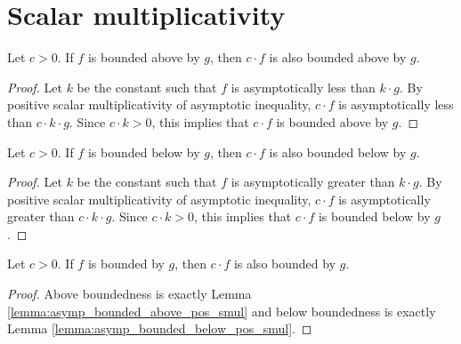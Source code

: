 \section{Scalar multiplicativity}

\begin{lemma}
    \label{lemma:asymp_bounded_above_pos_smul}
    \leanok
    Let $c > 0$. If $f$ is bounded above by $g$, then $c \cdot f$ is also bounded
    above by $g$.
\end{lemma}

\begin{proof}
    \leanok
    Let $k$ be the constant such that $f$ is asymptotically less than $k \cdot g$.
    By positive scalar multiplicativity of asymptotic inequality, $c \cdot f$ is 
    asymptotically less than $c \cdot k \cdot g$. Since $c \cdot k > 0$, this implies 
    that $c \cdot f$ is bounded above by $g$.
\end{proof}

\begin{lemma}
    \label{lemma:asymp_bounded_below_pos_smul}
    \leanok
    Let $c > 0$. If $f$ is bounded below by $g$, then $c \cdot f$ is also bounded
    below by $g$.
\end{lemma}

\begin{proof}
    \leanok
    Let $k$ be the constant such that $f$ is asymptotically greater than $k \cdot g$.
    By positive scalar multiplicativity of asymptotic inequality, $c \cdot f$ is 
    asymptotically greater than $c \cdot k \cdot g$. Since $c \cdot k > 0$, this implies
    that $c \cdot f$ is bounded below by $g$.
\end{proof}

\begin{lemma}
    \label{lemma:asymp_bounded_pos_smul}
    \leanok
    Let $c > 0$. If $f$ is bounded by $g$, then $c \cdot f$ is also bounded by $g$.
\end{lemma}

\begin{proof}
    \leanok
    Above boundedness is exactly Lemma \ref{lemma:asymp_bounded_above_pos_smul} and
    below boundedness is exactly Lemma \ref{lemma:asymp_bounded_below_pos_smul}.
\end{proof}

